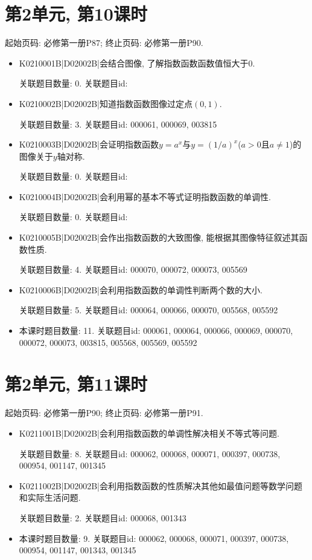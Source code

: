 \section*{第2单元, 第10课时}
起始页码: 必修第一册P87; 终止页码: 必修第一册P90.
\begin{itemize}
\item K0210001B|D02002B|会结合图像, 了解指数函数函数值恒大于$0$.

关联题目数量: 0. 关联题目id: 

\item K0210002B|D02002B|知道指数函数图像过定点$(0,1)$.

关联题目数量: 3. 关联题目id: 000061, 000069, 003815

\item K0210003B|D02002B|会证明指数函数$y=a^{x}$与$y=(1/a)^{x}$($a>0$且$a\neq1$)的图像关于$y$轴对称.

关联题目数量: 0. 关联题目id: 

\item K0210004B|D02002B|会利用幂的基本不等式证明指数函数的单调性.

关联题目数量: 0. 关联题目id: 

\item K0210005B|D02002B|会作出指数函数的大致图像, 能根据其图像特征叙述其函数性质.

关联题目数量: 4. 关联题目id: 000070, 000072, 000073, 005569

\item K0210006B|D02002B|会利用指数函数的单调性判断两个数的大小.

关联题目数量: 5. 关联题目id: 000064, 000066, 000070, 005568, 005592

\item 本课时题目数量: 11. 关联题目id: 000061, 000064, 000066, 000069, 000070, 000072, 000073, 003815, 005568, 005569, 005592

\end{itemize}

\section*{第2单元, 第11课时}
起始页码: 必修第一册P90; 终止页码: 必修第一册P91.
\begin{itemize}
\item K0211001B|D02002B|会利用指数函数的单调性解决相关不等式等问题.

关联题目数量: 8. 关联题目id: 000062, 000068, 000071, 000397, 000738, 000954, 001147, 001345

\item K0211002B|D02002B|会利用指数函数的性质解决其他如最值问题等数学问题和实际生活问题.

关联题目数量: 2. 关联题目id: 000068, 001343

\item 本课时题目数量: 9. 关联题目id: 000062, 000068, 000071, 000397, 000738, 000954, 001147, 001343, 001345

\end{itemize}

